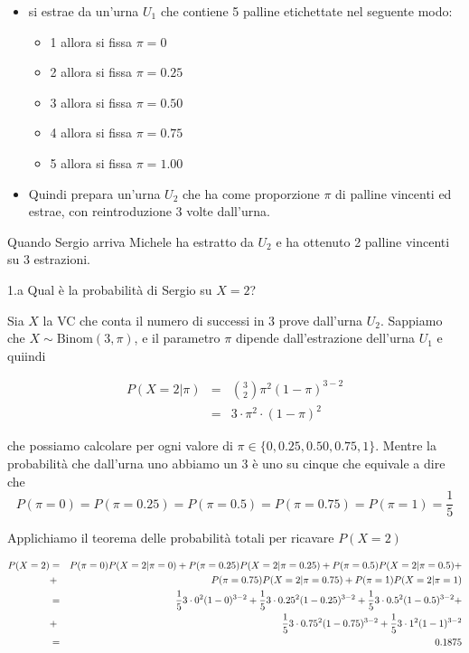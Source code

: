 \documentclass[
  11pt,
]{book}
\providecommand{\tightlist}{%
  \setlength{\itemsep}{0pt}\setlength{\parskip}{0pt}}
\theoremstyle{mytheoremstyle}
\theoremstyle{mydefstyle}
\newenvironment{sol}
  {
  \begin{tcolorbox}[enhanced,breakable,arc=0.1mm,boxrule=1pt,colback=white,colframe=iblue,
  title=\bf \fontfamily{lmss}\selectfont \hspace{.5 cm} Soluzione,drop fuzzy shadow]

}{
\end{tcolorbox}
  }
\begin{document}
\begin{itemize}
\tightlist
\item
  si estrae da un'urna \(U_1\) che contiene 5 palline etichettate nel seguente modo:

  \begin{itemize}
  \tightlist
  \item
    1 allora si fissa \(\pi=0\)
  \item
    2 allora si fissa \(\pi=0.25\)
  \item
    3 allora si fissa \(\pi=0.50\)
  \item
    4 allora si fissa \(\pi=0.75\)
  \item
    5 allora si fissa \(\pi=1.00\)
  \end{itemize}
\item
  Quindi prepara un'urna \(U_2\) che ha come proporzione \(\pi\) di palline vincenti ed estrae,
  con reintroduzione 3 volte dall'urna.
\end{itemize}

Quando Sergio arriva Michele ha estratto da \(U_2\) e ha ottenuto 2 palline vincenti su 3 estrazioni.

1.a Qual è la probabilità di Sergio su \(X=2\)?

\begin{sol}
Sia \(X\) la VC che conta il numero di successi in 3 prove dall'urna \(U_2\).
Sappiamo che \(X\sim\text{Binom}(3,\pi)\), e il parametro \(\pi\) dipende dall'estrazione dell'urna \(U_1\) e quiindi

\begin{eqnarray*}
  P(X=2|\pi) &=&  \binom{3}{2}\pi^2(1-\pi)^{3-2}\\
                 &=&  3\cdot \pi^2\cdot (1-\pi)^2
\end{eqnarray*}

che possiamo calcolare per ogni valore di \(\pi\in\{0,0.25,0.50,0.75,1\}\).
Mentre la probabilità che dall'urna uno abbiamo un 3 è uno su cinque che equivale a dire che
\[
P(\pi=0)=P(\pi=0.25)=P(\pi=0.5)=P(\pi=0.75)=P(\pi=1)=\frac 15
\]

Applichiamo il teorema delle probabilità totali per ricavare
\(P(X=2)\)

\begin{eqnarray*}
\scriptsize P(X=2)  &=&  \scriptsize P(\pi=0)P(X=2|\pi=0)+P(\pi=0.25)P(X=2|\pi=0.25)+P(\pi=0.5)P(X=2|\pi=0.5)+\\
        &+& \scriptsize P(\pi=0.75)P(X=2|\pi=0.75)+P(\pi=1)P(X=2|\pi=1)\\
 &=&  \scriptsize \frac 15 3\cdot 0^2 (1-0)^{3-2} + \frac 15 3\cdot 0.25^2 (1-0.25)^{3-2} + \frac 15 3\cdot 0.5^2 (1-0.5)^{3-2}+\\
 &+&  \scriptsize \frac 15 3\cdot 0.75^2 (1-0.75)^{3-2} + \frac 15 3\cdot 1^2 (1-1)^{3-2}\\
 &=& \scriptsize 0.1875
\end{eqnarray*}

\end{sol}
\end{document}
